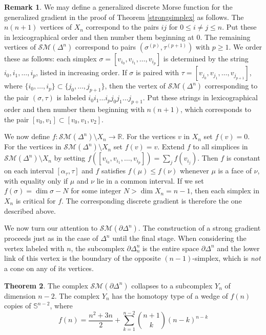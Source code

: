 \documentclass{amsart}
\theoremstyle{definition}
\newtheorem{theorem}{Theorem}[section]
\newtheorem{remark}[theorem]{Remark}
\newcommand{\zr}{{\mathbb R}}
\newcommand{\zs}{{\mathbb S}}
\newcommand{\sm}{{\mathcal{SM}}}
\begin{document}
\begin{remark}
    We may define a generalized discrete Morse function for the generalized gradient in the proof of Theorem \ref{strongsimplex} as follows. The $n(n+1)$ vertices of $X_n$ correspond to the pairs $ij$ for $0\le i\ne j\le n$. Put these in lexicographical order and then number them beginning at $0$. The remaining vertices of $\sm(\Delta^n)$ correspond to pairs $(\sigma^{(p)},\tau^{(p+1)})$ with $p\ge 1$. We order these as follows: each simplex $\sigma = [v_{i_0},v_{i_1},\dots,v_{i_p}]$ is determined by the string $i_0,i_1,\dots,i_p$, listed in increasing order. If $\sigma$ is paired with $\tau = [v_{j_0},v_{j_1},\dots,v_{j_{p+1}}]$, where $\{i_0,\dots,i_p\}\subset\{j_0,\dots,j_{p+1}\}$, then the vertex of $\sm(\Delta^n)$ corresponding to the pair $(\sigma,\tau)$ is labeled $i_0i_1\dots i_pj_0j_1\dots j_{p+1}$. Put these strings in lexicographical order and then number them beginning with $n(n+1)$, which corresponds to the pair $[v_0,v_1]\subset [v_0,v_1,v_2]$.  
    
    We now define $f:\sm(\Delta^n)\setminus X_n\to\zr$. For the vertices $v$ in $X_n$ set $f(v) = 0$. For the vertices in $\sm(\Delta^n)\setminus X_n$ set $f(v)=v$. Extend $f$ to all simplices in $\sm(\Delta^n)\setminus X_n$ by setting $f([v_{i_0},v_{i_1},\dots,v_{i_p}]) = \sum_j f(v_{i_j})$. Then $f$ is constant on each interval $[\alpha_\tau,\tau]$ and $f$ satisfies $f(\mu)\le f(\nu)$ whenever $\mu$ is a face of $\nu$, with equality only if $\mu$ and $\nu$ lie in a common interval. If we set $f(\sigma) = \dim\sigma - N$ for some integer $N>\dim X_n = n-1$, then each simplex in $X_n$ is critical for $f$. The corresponding discrete gradient is therefore the one described above.
\end{remark}

We now turn our attention to $\sm(\partial\Delta^n)$. The construction of a strong gradient proceeds just as in the case of $\Delta^n$ until the final stage. When considering the vertex labeled with $n$, the subcomplex $\partial\Delta^n_n$ is the entire space $\partial\Delta^n$ and the lower link of this vertex is the boundary of the opposite $(n-1)$-simplex, which is {\em not} a cone on any of its vertices.

\begin{theorem}\label{strongboundary}
    The complex $\sm(\partial\Delta^n)$ collapses to a subcomplex $Y_n$ of dimension $n-2$. The complex $Y_n$ has the homotopy type of a wedge of $f(n)$ copies of $\zs^{n-2}$, where
    \begin{equation*}
    f(n) = \frac{n^2 + 3n}{2} + \sum_{k=1}^{n-2} \binom{n+1}{k}(n-k)^{n-k}
    \end{equation*}
\end{theorem}
\end{document}
